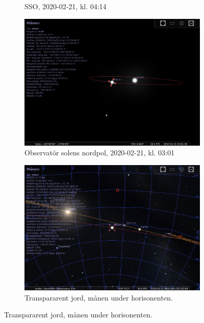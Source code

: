 \documentclass[./exercises.tex]{subfiles}
\begin{document}
\begin{itemize}
\begin{figure}[H]
\begin{subfigure}[b]{0.45\textwidth}
         \caption{SSO, 2020-02-21, kl. 04:14}
         \label{fig:y equals x}
     \end{subfigure}
     \hfill
     \begin{subfigure}[b]{0.45\textwidth}
         \centering
         \includegraphics[width=\textwidth]{Stellarium1/WXCresc/stellarium-001.png}
         \caption{Observatör solens nordpol, 2020-02-21, kl. 03:01}
         \label{fig:three sin x}
     \end{subfigure}
     \hfill
     \begin{subfigure}[b]{0.45\textwidth}
         \centering
         \includegraphics[width=\textwidth]{Stellarium1/WXCresc/stellarium-002.png}
         \caption{Transpararent jord, månen under horisonenten.}
         \label{fig:three sin x}
     \end{subfigure}

\end{figure}
\end{itemize}
\end{document}
